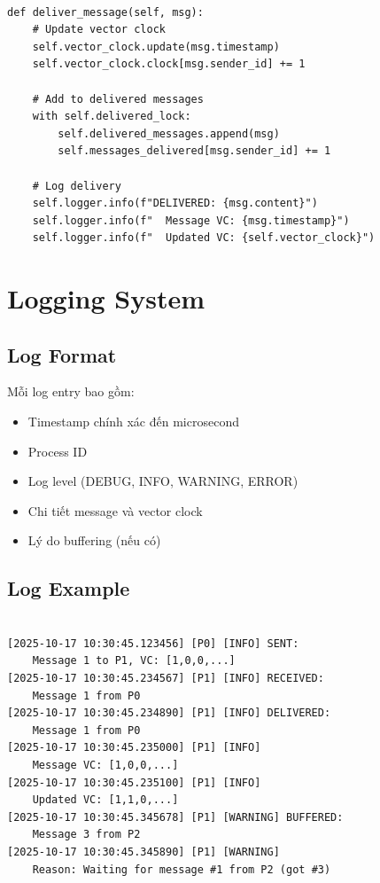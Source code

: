 \begin{listing}[H]
\begin{verbatim}

def deliver_message(self, msg):
    # Update vector clock
    self.vector_clock.update(msg.timestamp)
    self.vector_clock.clock[msg.sender_id] += 1
    
    # Add to delivered messages
    with self.delivered_lock:
        self.delivered_messages.append(msg)
        self.messages_delivered[msg.sender_id] += 1
    
    # Log delivery
    self.logger.info(f"DELIVERED: {msg.content}")
    self.logger.info(f"  Message VC: {msg.timestamp}")
    self.logger.info(f"  Updated VC: {self.vector_clock}")
\end{verbatim}
\caption{Deliver Message Implementation}
\end{listing}

\section{Logging System}

\subsection{Log Format}

Mỗi log entry bao gồm:
\begin{itemize}
    \item Timestamp chính xác đến microsecond
    \item Process ID
    \item Log level (DEBUG, INFO, WARNING, ERROR)
    \item Chi tiết message và vector clock
    \item Lý do buffering (nếu có)
\end{itemize}

\subsection{Log Example}

\begin{listing}[H]
\begin{verbatim}

[2025-10-17 10:30:45.123456] [P0] [INFO] SENT: 
    Message 1 to P1, VC: [1,0,0,...]
[2025-10-17 10:30:45.234567] [P1] [INFO] RECEIVED: 
    Message 1 from P0
[2025-10-17 10:30:45.234890] [P1] [INFO] DELIVERED: 
    Message 1 from P0
[2025-10-17 10:30:45.235000] [P1] [INFO]   
    Message VC: [1,0,0,...]
[2025-10-17 10:30:45.235100] [P1] [INFO]   
    Updated VC: [1,1,0,...]
[2025-10-17 10:30:45.345678] [P1] [WARNING] BUFFERED: 
    Message 3 from P2
[2025-10-17 10:30:45.345890] [P1] [WARNING]   
    Reason: Waiting for message #1 from P2 (got #3)
\end{verbatim}
\caption{Log File Example}
\end{listing}

